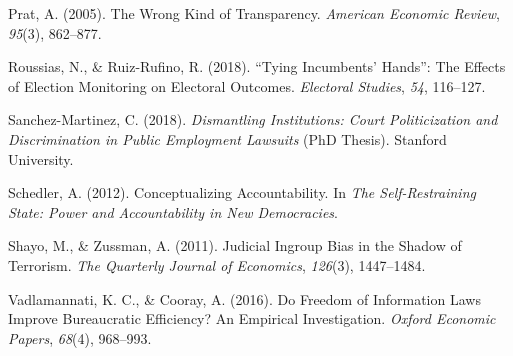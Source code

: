 \documentclass[]{article}
\begin{document}
\leavevmode\hypertarget{ref-PratWrongKindTransparency2005}{}%
Prat, A. (2005). The Wrong Kind of Transparency. \emph{American Economic
Review}, \emph{95}(3), 862--877.

\leavevmode\hypertarget{ref-RoussiasTyingIncumbentsHands2018}{}%
Roussias, N., \& Ruiz-Rufino, R. (2018). ``Tying Incumbents' Hands'':
The Effects of Election Monitoring on Electoral Outcomes.
\emph{Electoral Studies}, \emph{54}, 116--127.

\leavevmode\hypertarget{ref-Sanchez-MartinezDismantlingInstitutionsCourt2018}{}%
Sanchez-Martinez, C. (2018). \emph{Dismantling Institutions: Court
Politicization and Discrimination in Public Employment Lawsuits} (PhD
Thesis). Stanford University.

\leavevmode\hypertarget{ref-SchedlerConceptualizingAccountability2012}{}%
Schedler, A. (2012). Conceptualizing Accountability. In \emph{The
Self-Restraining State: Power and Accountability in New Democracies}.

\leavevmode\hypertarget{ref-ShayoJudicialIngroupBias2011}{}%
Shayo, M., \& Zussman, A. (2011). Judicial Ingroup Bias in the Shadow of
Terrorism. \emph{The Quarterly Journal of Economics}, \emph{126}(3),
1447--1484.

\leavevmode\hypertarget{ref-VadlamannatiFreedomInformationLaws2016}{}%
Vadlamannati, K. C., \& Cooray, A. (2016). Do Freedom of Information
Laws Improve Bureaucratic Efficiency? An Empirical Investigation.
\emph{Oxford Economic Papers}, \emph{68}(4), 968--993.
\end{document}
